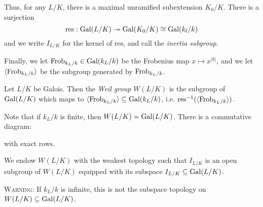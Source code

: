 \documentclass[10pt,a4paper]{article}
\begin{document}
Thus, for any $L/K$, there is a maximal unramified subextension $K_0/K$. There is a surjection
\[\text{res}:\operatorname{Gal}(L/K) \twoheadrightarrow \operatorname{Gal}(K_0/K) \cong \operatorname{Gal}(k_l/k)\]
and we write $I_{L/K}$ for the kernel of $\text{res}$, and call the \emph{inertia subgroup}.

Finally, we let $\operatorname{Frob}_{k_L/k} \in \operatorname{Gal}(k_L/k)$ be the Frobenius map $x \mapsto x^{|k|}$, and we let $\langle \operatorname{Frob}_{k_L/k} \rangle$ be the subgroup generated by $\operatorname{Frob}_{k_L/k}$.
\begin{definition}
  Let $L/K$ be Galois. Then the \emph{Weil group} $W(L/K)$ is the subgroup of $\operatorname{Gal}(L/K)$ which maps to $\langle \operatorname{Frob}_{k_L/k} \rangle \subseteq \operatorname{Gal}(k_L/k)$, i.e. $\text{res}^{-1}(\langle \operatorname{Frob}_{k_L/k} \rangle)$.
\end{definition}
Note that if $k_L/k$ is finite, then $W(L/K) = \operatorname{Gal}(L/K)$. There is a commutative diagram:
\begin{center}
\end{center}
with exact rows.

We endow $W(L/K)$ with the weakest topology such that $I_{L/K}$ is an open subgroup of $W(L/K)$ equipped with its subspace $I_{L/K}\subseteq \operatorname{Gal}(L/K)$.

\textsc{Warning:} If $k_L/k$ is infinite, this is not the subspace topology on $W(L/K)\subseteq \operatorname{Gal}(L/K)$.
\end{document}
